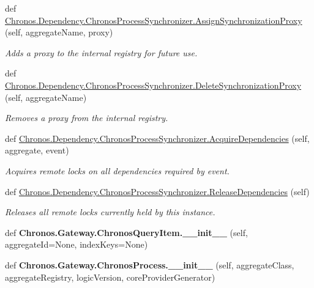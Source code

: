 \begin{DoxyCompactItemize}
\item 
def \hyperlink{group__Chronos_gaa5b77aa034528a45a2ea7ae04b430a2e}{Chronos.\+Dependency.\+Chronos\+Process\+Synchronizer.\+Assign\+Synchronization\+Proxy} (self, aggregate\+Name, proxy)
\begin{DoxyCompactList}\small\item\em Adds a proxy to the internal registry for future use. \end{DoxyCompactList}\item 
def \hyperlink{group__Chronos_gaaf20aa3e37294492cf6f320d49ff64f2}{Chronos.\+Dependency.\+Chronos\+Process\+Synchronizer.\+Delete\+Synchronization\+Proxy} (self, aggregate\+Name)
\begin{DoxyCompactList}\small\item\em Removes a proxy from the internal registry. \end{DoxyCompactList}\item 
def \hyperlink{group__Chronos_gad0ed4fb65d7d916312cd89e03a3c997a}{Chronos.\+Dependency.\+Chronos\+Process\+Synchronizer.\+Acquire\+Dependencies} (self, aggregate, event)
\begin{DoxyCompactList}\small\item\em Acquires remote locks on all dependencies required by {\ttfamily event}. \end{DoxyCompactList}\item 
def \hyperlink{group__Chronos_ga461ce8c35896b5ebe0e18f3a76226c98}{Chronos.\+Dependency.\+Chronos\+Process\+Synchronizer.\+Release\+Dependencies} (self)\hypertarget{group__Chronos_ga461ce8c35896b5ebe0e18f3a76226c98}{}\label{group__Chronos_ga461ce8c35896b5ebe0e18f3a76226c98}

\begin{DoxyCompactList}\small\item\em Releases all remote locks currently held by this instance. \end{DoxyCompactList}\item 
def {\bfseries Chronos.\+Gateway.\+Chronos\+Query\+Item.\+\_\+\+\_\+init\+\_\+\+\_\+} (self, aggregate\+Id=None, index\+Keys=None)\hypertarget{group__Chronos_ga060ca14c3305942819c840092e57814a}{}\label{group__Chronos_ga060ca14c3305942819c840092e57814a}

\item 
def {\bfseries Chronos.\+Gateway.\+Chronos\+Process.\+\_\+\+\_\+init\+\_\+\+\_\+} (self, aggregate\+Class, aggregate\+Registry, logic\+Version, core\+Provider\+Generator)\hypertarget{group__Chronos_ga0252467e93fe730084286a314688d3c9}{}\label{group__Chronos_ga0252467e93fe730084286a314688d3c9}


\end{DoxyCompactItemize}
